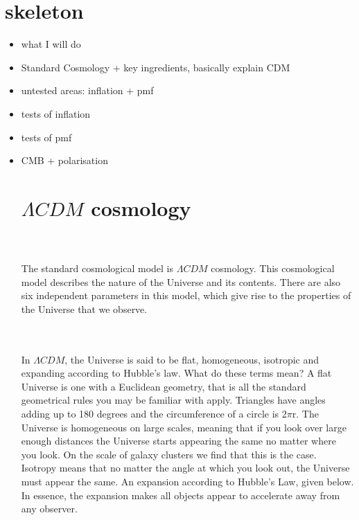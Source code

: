 \documentclass[12pt]{report}
\begin{document}
\section*{skeleton}
\begin{itemize}
\item what I will do
\item Standard Cosmology + key ingredients, basically explain \lambda CDM
\item untested areas: inflation + pmf
\item tests of inflation
\item tests of pmf
\item CMB + polarisation
\section*{}
\vspace*{\fill}

\section{$\Lambda CDM$ cosmology}

\\\\The standard cosmological model is $\Lambda CDM$ cosmology. This cosmological model describes the nature of the Universe and its contents. There are also six independent parameters in this model, which give rise to the properties of the Universe that we observe.

\\\\In $\Lambda CDM$, the Universe is said to be flat, homogeneous, isotropic and expanding according to Hubble's law. What do these terms mean? A flat Universe is one with a Euclidean geometry, that is all the standard geometrical rules you may be familiar with apply. Triangles have angles adding up to 180 degrees and the circumference of a circle is 2$\pi$r. The Universe is homogeneous on large scales, meaning that if you look over large enough distances the Universe starts appearing the same no matter where you look. On the scale of galaxy clusters we find that this is the case. Isotropy means that no matter the angle at which you look out, the Universe must appear the same. An expansion according to Hubble's Law, given below. In essence, the expansion makes all objects appear to accelerate away from any observer.


\end{itemize}
\end{document}
